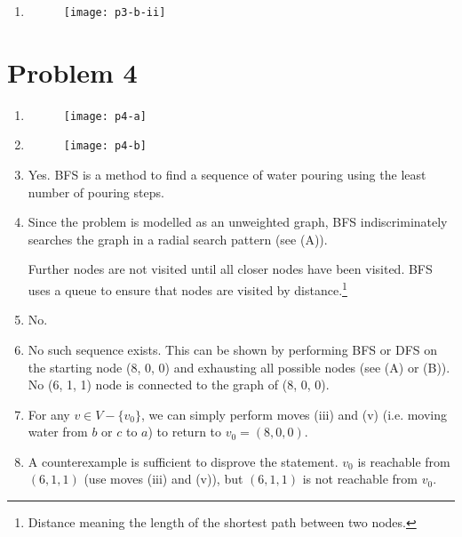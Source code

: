 \documentclass[12pt,a4paper]{article}
\begin{document}
\begin{enumerate}
\begin{enumerate}[label=(\roman*)]
			\item \-
			\begin{figure}[H]
				\texttt{[image: p3-b-ii]}
				\centering
			\end{figure}

		\end{enumerate}
		
	\end{enumerate} 


\newpage
\section*{Problem 4}
	\begin{enumerate}[label=(\Alph*)]
		\item \-
		\begin{figure}[H]
			\texttt{[image: p4-a]}
			\centering
		\end{figure}
		
		\item \-
		\begin{figure}[H]
			\texttt{[image: p4-b]}
			\centering
		\end{figure}

		\item Yes. BFS is a method to find a sequence of water pouring using the least number of pouring steps.
		
		\item
		Since the problem is modelled as an unweighted graph, BFS indiscriminately searches the graph in a radial search pattern (see (A)).
		
		Further nodes are not visited until all closer nodes have been visited. BFS uses a queue to ensure that nodes are visited by distance.\footnote{Distance meaning the length of the shortest path between two nodes.}

		\item No.
		\item No such sequence exists. This can be shown by performing BFS or DFS on the starting node (8, 0, 0) and exhausting all possible nodes (see (A) or (B)). No (6, 1, 1) node is connected to the graph of (8, 0, 0).
		
		\item For any $v \in V - \{v_0\}$, we can simply perform moves (iii) and (v) (i.e. moving water from $b$ or $c$ to $a$) to return to $v_0 = (8, 0, 0)$.

		\item A counterexample is sufficient to disprove the statement. $v_0$ is reachable from $(6, 1, 1)$ (use moves (iii) and (v)), but $(6, 1, 1)$ is not reachable from $v_0$.


	\end{enumerate}
\end{document}

